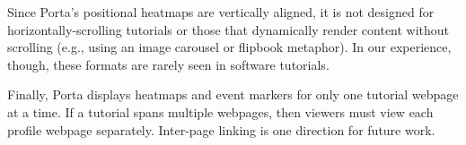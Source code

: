 Since Porta's positional heatmaps are vertically aligned, it is not
designed for horizontally-scrolling tutorials or those that
dynamically render content without scrolling (e.g.,
using an image carousel or flipbook metaphor). In our experience,
though, these formats are rarely seen in software tutorials.

Finally, Porta displays heatmaps and event markers for only one tutorial
webpage at a time. If a tutorial spans multiple webpages, then viewers
must view each profile webpage separately. Inter-page linking is one
direction for future work.

